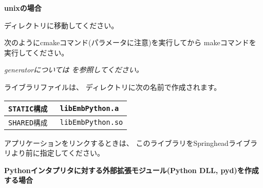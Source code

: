 \medskip
\bf{unixの場合}
\label{subsec:EmbPython_SprPythonDLL_unix}
\begin{narrow}
	ディレクトリに移動してください。

	次のようにcmakeコマンド(パラメータに注意)を実行してから
	makeコマンドを実行してください。


	\begin{narrow}[s]
		\it{generator}については
		 を参照してください。
	\end{narrow}

	\medskip
	ライブラリファイルは、
	ディレクトリに次の名前で作成されます。

	\medskip
	\begin{narrow}[20pt]
	\begin{tabular}{l@{\ \ ---\ \ }l}\hline
		\tt{STATIC}構成 & \tt{libEmbPython.a}\\\hline
		\tt{SHARED}構成 & \tt{libEmbPython.so}\\\hline
	\end{tabular}
	\end{narrow}

	\bigskip
	アプリケーションをリンクするときは、
	このライブラリをSpringheadライブラリより前に指定してください。
\end{narrow}

\bigskip
\thinrule{\linewidth}

\noindent
\bf{Pythonインタプリタに対する外部拡張モジュール(Python DLL, pyd)を作成する場合}

